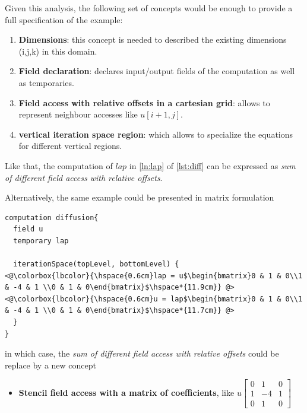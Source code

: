 \documentclass[a4paper,10pt]{scrartcl}
\begin{document}
Given this analysis, the following set of concepts would be enough to provide a full specification of the example: 

\begin{enumerate}[label=\textbf{C.\arabic*}]
  \item \textbf{Dimensions}: this concept is needed to described the existing dimensions (i,j,k) in this domain.
  \item \textbf{Field declaration}: declares input/output fields of the computation as well as temporaries.
  \item \textbf{Field access with relative offsets in a cartesian grid}: allows to represent neighbour accesses like $u[i+1,j]$. \label{C:FieldAccess}
  \item \textbf{vertical iteration space region}: which allows to specialize the equations for different vertical regions.
\end{enumerate}

Like that, the computation of $lap$ in \cref{ln:lap} of \cref{lst:diff} can be expressed as \textit{sum of different field access with relative offsets}.

Alternatively, the same example could be presented in matrix formulation

\begin{lstlisting}
computation diffusion{
  field u
  temporary lap
  
  iterationSpace(topLevel, bottomLevel) {
<@\colorbox{lbcolor}{\hspace{0.6cm}lap = u$\begin{bmatrix}0 & 1 & 0\\1 & -4 & 1 \\0 & 1 & 0\end{bmatrix}$\hspace*{11.9cm}} @>
<@\colorbox{lbcolor}{\hspace{0.6cm}u = lap$\begin{bmatrix}0 & 1 & 0\\1 & -4 & 1 \\0 & 1 & 0\end{bmatrix}$\hspace*{11.7cm}} @>
  }
}
\end{lstlisting}

in which case, the \textit{sum of different field access with relative offsets} could be replace by a new concept
\begin{itemize}
	\item \textbf{Stencil field access with a matrix of coefficients}, like $u\begin{bmatrix}0 & 1 & 0\\1 & -4 & 1 \\0 & 1 & 0\end{bmatrix}$
\end{itemize}
\end{document}
